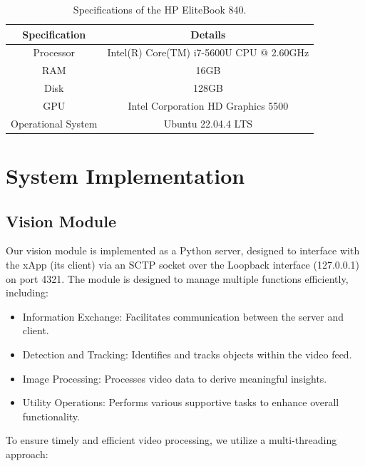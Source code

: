 \begin{table}[H]
    \caption{Specifications of the HP EliteBook 840.}
    \label{tab:specs_pc_ue}
    \begin{tabular}{|c|c|}
        \hline
        \textbf{Specification} & \textbf{Details} \\ \hline
        Processor                      &  Intel(R) Core(TM) i7-5600U CPU @ 2.60GHz          \\ \hline
        RAM                      &          16GB        \\ \hline
        Disk                      &   128GB         \\ \hline
        GPU                     &   Intel Corporation HD Graphics 5500                \\ \hline
        Operational System & Ubuntu 22.04.4 LTS                  \\ \hline  %
    \end{tabular}
\end{table}

\section{System Implementation}\label{sec:impl}

\subsection{Vision Module}\label{subsec:vision-module}
Our vision module is implemented as a Python server, designed to interface with the xApp (its client) via an SCTP socket over the Loopback interface (127.0.0.1) on port 4321.
The module is designed to manage multiple functions efficiently, including:

\begin{itemize}
\item Information Exchange: Facilitates communication between the server and client.
\item Detection and Tracking: Identifies and tracks objects within the video feed.
\item Image Processing: Processes video data to derive meaningful insights.
\item Utility Operations: Performs various supportive tasks to enhance overall functionality.
\end{itemize}

To ensure timely and efficient video processing, we utilize a multi-threading approach:

